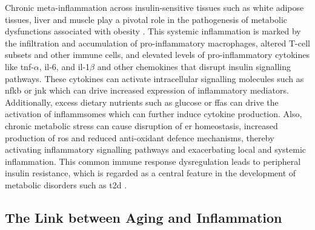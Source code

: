 \par Chronic meta-inflammation across insulin-sensitive tissues such as white adipose tissues, liver and muscle play a pivotal role in the pathogenesis of metabolic dysfunctions associated with obesity \textbf{\cite{gregor_inflammatory_2011,hotamisligil_inflammation_2017}}. This systemic inflammation is marked by the infiltration and accumulation of pro-inflammatory macrophages, altered T-cell subsets and other immune cells, and elevated levels of pro-inflammatory cytokines like \gls{tnf}-$\alpha$, \gls{il}-6, and \gls{il}-1$\beta$ and other chemokines that disrupt insulin signalling pathways. These cytokines can activate intracellular signalling molecules such as \gls{nfkb} or \gls{jnk} which can drive increased expression of inflammatory mediators. Additionally, excess dietary nutrients such as glucose or \glspl{ffa} can drive the activation of inflammsomes which can further induce cytokine production. Also, chronic metabolic stress can cause disruption of \gls{er} homeostasis, increased production of \gls{ros} and reduced anti-oxidant defence mechanisms, thereby activating inflammatory signalling pathways and exacerbating local and systemic inflammation. This common immune response dysregulation leads to peripheral insulin resistance, which is regarded as a central feature in the development of metabolic disorders such as \gls{t2d} \textbf{\cite{greenberg_obesity_2006,wu_metabolic_2020,luo_inflammation_2020,kawai_adipose_2021,kim_metabolic_2021,rohm_inflammation_2022,wu_skeletal_2017}}.

\subsection{The Link between Aging and Inflammation}
\label{sec:immune_aging}

